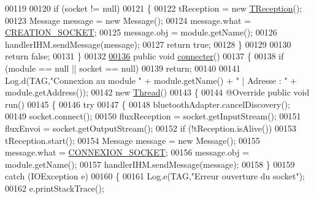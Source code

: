 \begin{DoxyCode}
00119 
00120         \textcolor{keywordflow}{if} (socket != null)
00121         \{
00122             tReception = \textcolor{keyword}{new} \hyperlink{classcom_1_1example_1_1area_1_1_liaison_bluetooth_1_1_t_reception}{TReception}();
00123             Message message = \textcolor{keyword}{new} Message();
00124             message.what = \hyperlink{classcom_1_1example_1_1area_1_1_liaison_bluetooth_ac961c73879bd0de9933b2fc310cc5e7e}{CREATION\_SOCKET};
00125             message.obj = module.getName();
00126             handlerIHM.sendMessage(message);
00127             \textcolor{keywordflow}{return} \textcolor{keyword}{true};
00128         \}
00129 
00130         \textcolor{keywordflow}{return} \textcolor{keyword}{false};
00131     \}
00132 
\hyperlink{classcom_1_1example_1_1area_1_1_liaison_bluetooth_a7b9662a4224762b23c814d1f4539002a}{00136}     \textcolor{keyword}{public} \textcolor{keywordtype}{void} \hyperlink{classcom_1_1example_1_1area_1_1_liaison_bluetooth_a7b9662a4224762b23c814d1f4539002a}{connecter}()
00137     \{
00138         \textcolor{keywordflow}{if} (module == null || socket == null)
00139             \textcolor{keywordflow}{return};
00140 
00141         Log.d(TAG,\textcolor{stringliteral}{"Connexion au module "} + module.getName() + \textcolor{stringliteral}{" | Adresse : "} + module.getAddress());
00142         \textcolor{keyword}{new} \hyperlink{class_thread}{Thread}()
00143         \{
00144             @Override \textcolor{keyword}{public} \textcolor{keywordtype}{void} run()
00145             \{
00146                 \textcolor{keywordflow}{try}
00147                 \{
00148                     bluetoothAdapter.cancelDiscovery();
00149                     socket.connect();
00150                     fluxReception = socket.getInputStream();
00151                     fluxEnvoi = socket.getOutputStream();
00152                     \textcolor{keywordflow}{if} (!tReception.isAlive())
00153                         tReception.start();
00154                     Message message = \textcolor{keyword}{new} Message();
00155                     message.what = \hyperlink{classcom_1_1example_1_1area_1_1_liaison_bluetooth_a4870b4fac5c0f1aedac1bb40346d43da}{CONNEXION\_SOCKET};
00156                     message.obj = module.getName();
00157                     handlerIHM.sendMessage(message);
00158                 \}
00159                 \textcolor{keywordflow}{catch} (IOException e)
00160                 \{
00161                     Log.e(TAG,\textcolor{stringliteral}{"Erreur ouverture du socket"});
00162                     e.printStackTrace();

\end{DoxyCode}
